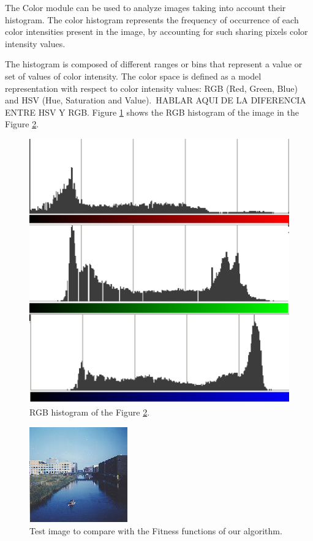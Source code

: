 \documentclass[conference]{IEEEtran}
\begin{document}
The Color module can be used to analyze images taking into account their histogram. The color histogram represents the frequency of occurrence of each color intensities present in the image, by accounting for such sharing pixels color intensity values.

The histogram is composed of different ranges or bins that represent a value or set of values ​​of color intensity. The color space is defined as a model representation with respect to color intensity values: RGB (Red, Green, Blue) and HSV (Hue, Saturation and Value). HABLAR AQUI DE LA DIFERENCIA ENTRE HSV Y RGB. Figure \ref{fig:histogram} shows the RGB histogram of the image in the Figure \ref{fig:flevopark}.

\begin{figure}
\centering
   \includegraphics[scale =0.6] {images/histogram.eps}
\caption{RGB histogram of the Figure \ref{fig:flevopark}. }
\label{fig:histogram}
\end{figure}

\begin{figure}
\centering
   \includegraphics[scale =3] {images/flevopark.eps}
\caption{Test image to compare with the Fitness functions of our algorithm.}
\label{fig:flevopark}
\end{figure}
\end{document}
